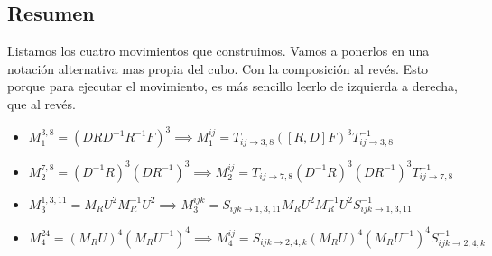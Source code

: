 \documentclass{article}
\theoremstyle{definition}
\begin{document}
\subsection{Resumen}
Listamos los cuatro movimientos que construimos. Vamos a ponerlos en una notación alternativa mas propia del cubo. Con la composición al revés. Esto porque para ejecutar el movimiento, es más sencillo leerlo de izquierda a derecha, que al revés.
\begin{itemize}
    \item $M_1^{3,8}=(DRD^{-1}R^{-1}F)^3\implies M_1^{ij}=T_{ij\to3,8}([R,D]F)^3T_{ij\to 3,8}^{-1}$
    \item $M_2^{7,8}=(D^{-1}R)^3(DR^{-1})^3\implies M_2^{ij}=T_{ij\to 7,8}(D^{-1}R)^3(DR^{-1})^3T_{ij\to7,8}^{-1}$
    \item $M_3^{1,3,11}=M_RU^2M_R^{-1}U^2\implies M_3^{ijk}=S_{ijk\to1,3,11}M_RU^2M_R^{-1}U^2S_{ijk\to1,3,11}^{-1}$
    \item $M_4^{24}=(M_RU)^4(M_RU^{-1})^4\implies M_4^{ij}=S_{ijk\to2,4,k}(M_RU)^4(M_RU^{-1})^4S_{ijk\to 2,4,k}^{-1}$
\end{itemize}
\end{document}
